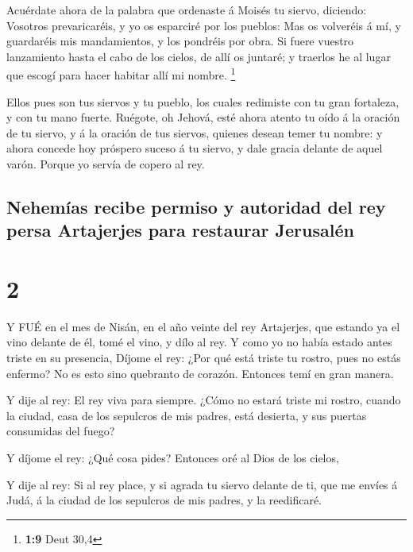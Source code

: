 Acuérdate ahora de la palabra que ordenaste á Moisés tu
siervo, diciendo: Vosotros prevaricaréis, y yo os esparciré por los
pueblos:  Mas os volveréis á mí, y guardaréis mis
mandamientos, y los pondréis por obra. Si fuere vuestro lanzamiento
hasta el cabo de los cielos, de allí os juntaré; y traerlos he al lugar
que escogí para hacer habitar allí mi nombre. \footnote{\textbf{1:9}
  Deut 30,4}

 Ellos pues son tus siervos y tu pueblo, los cuales
redimiste con tu gran fortaleza, y con tu mano fuerte. 
Ruégote, oh Jehová, esté ahora atento tu oído á la oración de tu siervo,
y á la oración de tus siervos, quienes desean temer tu nombre: y ahora
concede hoy próspero suceso á tu siervo, y dale gracia delante de aquel
varón. Porque yo servía de copero al rey.

\hypertarget{nehemuxedas-recibe-permiso-y-autoridad-del-rey-persa-artajerjes-para-restaurar-jerusaluxe9n}{%
\subsection{Nehemías recibe permiso y autoridad del rey persa Artajerjes
para restaurar
Jerusalén}\label{nehemuxedas-recibe-permiso-y-autoridad-del-rey-persa-artajerjes-para-restaurar-jerusaluxe9n}}

\hypertarget{section-1}{%
\section{2}\label{section-1}}

 Y FUÉ en el mes de Nisán, en el año veinte del rey
Artajerjes, que estando ya el vino delante de él, tomé el vino, y dílo
al rey. Y como yo no había estado antes triste en su presencia,
 Díjome el rey: ¿Por qué está triste tu rostro, pues no
estás enfermo? No es esto sino quebranto de corazón. Entonces temí en
gran manera.

 Y dije al rey: El rey viva para siempre. ¿Cómo no estará
triste mi rostro, cuando la ciudad, casa de los sepulcros de mis padres,
está desierta, y sus puertas consumidas del fuego?

 Y díjome el rey: ¿Qué cosa pides? Entonces oré al Dios de
los cielos,

 Y dije al rey: Si al rey place, y si agrada tu siervo
delante de ti, que me envíes á Judá, á la ciudad de los sepulcros de mis
padres, y la reedificaré.

